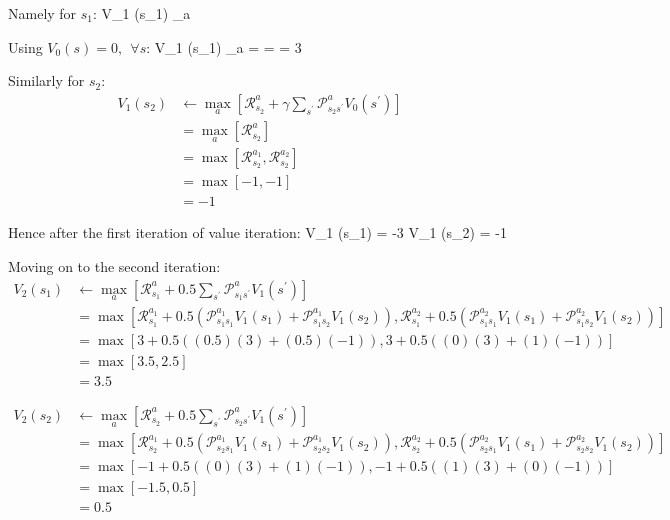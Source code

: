 Namely for $s_1$:
\bse
V_1 (s_1) \gets \max_{a} 
\ese

Using $V_0 (s) = 0, \:\: \forall s$:
\bse
V_1 (s_1) \gets \max_{a}  = \max {} = \max \left[ 3, 3 \right] = 3
\ese

Similarly for $s_2$:
\vspace{-10pt}
{\setlength{\jot}{5pt}
\begin{align*}
V_1 (s_2) &\gets \max_{a} \left[ \mathcal{R}_{s_2}^{a} +
\gamma \sum_{s^{\prime}} \mathcal{P}_{s_2 s^\prime}^{a} V_0 (s^\prime) \right] \\
& = \max_{a} \left[ \mathcal{R}_{s_2}^{a} \right] \\
& = \max \left[ \mathcal{R}_{s_2}^{a_1}, \mathcal{R}_{s_2}^{a_2} \right] \\
& = \max \left[ -1, -1 \right] \\
& = -1
\end{align*}}

\vspace{-10pt}

Hence after the first iteration of value iteration:
\bse
V_1 (s_1) = -3 \qquad V_1 (s_2) = -1
\ese

Moving on to the second iteration:
{\setlength{\jot}{10pt}
\begin{align*}
V_2 (s_1) & \gets \max_{a} \left[ \mathcal{R}_{s_1}^{a} +
0.5 \sum_{s^{\prime}} \mathcal{P}_{s_1 s^\prime}^{a} V_1 (s^\prime) \right] \\
& = \max \left[ \mathcal{R}_{s_1}^{a_1} + 0.5 \left( \mathcal{P}_{s_1 s_1}^{a_1} V_1 (s_1) +
\mathcal{P}_{s_1 s_2}^{a_1} V_1 (s_2) \right), \mathcal{R}_{s_1}^{a_2} +
0.5 \left( \mathcal{P}_{s_1 s_1}^{a_2} V_1 (s_1) + \mathcal{P}_{s_1 s_2}^{a_2} V_1 (s_2) \right) \right] \\
& = \max \left[ 3 + 0.5 \left( (0.5) (3) + (0.5) (-1) \right), 3 + 0.5 \left( (0) (3) + (1) (-1) \right) \right] \\
& = \max \left[ 3.5, 2.5 \right] \\
& = 3.5
\end{align*}}

\vspace{-30pt}

{\setlength{\jot}{10pt}
\begin{align*}
V_2 (s_2) & \gets \max_{a} \left[ \mathcal{R}_{s_2}^{a} + 0.5 \sum_{s^{\prime}}
\mathcal{P}_{s_2 s^\prime}^{a} V_1 (s^\prime) \right] \\
& = \max \left[ \mathcal{R}_{s_2}^{a_1} + 0.5 \left(\mathcal{P}_{s_2 s_1}^{a_1} V_1 (s_1) +
\mathcal{P}_{s_2 s_2}^{a_1} V_1 (s_2) \right), \mathcal{R}_{s_2}^{a_2} +
0.5 \left( \mathcal{P}_{s_2 s_1}^{a_2} V_1 (s_1) + \mathcal{P}_{s_2 s_2}^{a_2} V_1 (s_2) \right) \right] \\
& = \max \left[ -1 + 0.5 \left( (0) (3) + (1) (-1) \right), -1 + 0.5 \left( (1) (3) + (0) (-1) \right) \right] \\
& = \max \left[ -1.5, 0.5 \right] \\
& = 0.5
\end{align*}}

